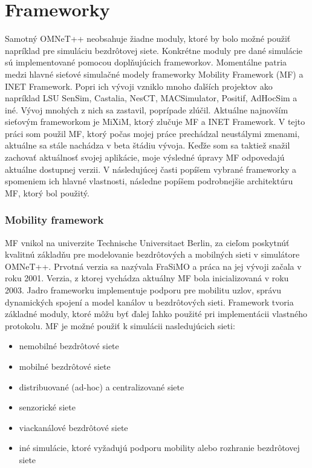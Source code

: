 \documentclass[11pt,twoside,a4paper]{book}
\begin{document}

\chapter{Frameworky}
Samotný OMNeT++ neobsahuje žiadne moduly, ktoré by bolo možné použiť napríklad pre simuláciu bezdrôtovej siete. Konkrétne moduly pre dané simulácie sú implementované pomocou doplňujúcich frameworkov. Momentálne patria medzi hlavné sieťové simulačné modely frameworky Mobility Framework (MF) a INET Framework\cite{INET}. Popri ich vývoji vzniklo mnoho ďalších projektov ako napríklad LSU SenSim, Castalia, NesCT, MACSimulator, Positif, AdHocSim a iné. Vývoj mnohých z nich sa zastavil, poprípade zlúčil. Aktuálne najnovším sieťovým frameworkom je MiXiM\cite{MIXIM}, ktorý zlučuje MF a INET Framework. V tejto práci som použil MF, ktorý počas mojej práce prechádzal neustálymi zmenami, aktuálne sa stále nachádza v beta štádiu vývoja. Keďže som sa taktiež snažil zachovať aktuálnosť svojej aplikácie, moje výsledné úpravy MF odpovedajú aktuálne dostupnej verzii. V následujúcej časti popíšem vybrané frameworky a spomeniem ich hlavné vlastnosti, následne popíšem podrobnejšie architektúru MF, ktorý bol použitý.

\subsection{Mobility framework}
MF vnikol na univerzite Technische Universitaet Berlin, za cieľom poskytnúť kvalitnú základňu pre modelovanie bezdrôtových a mobilných sieti v simulátore OMNeT++. Prvotná verzia sa nazývala FraSiMO a práca na jej vývoji začala v roku 2001. Verzia, z ktorej vychádza aktuálny MF bola inicializovaná v roku 2003. Jadro frameworku implementuje podporu pre mobilitu uzlov, správu dynamických spojení a model kanálov u bezdrôtových sieti. Framework tvoria základné moduly, ktoré môžu byť ďalej ľahko použité pri implementácii vlastného protokolu. MF je možné použiť k simulácii nasledujúcich sieti:
\begin{itemize}
 \item nemobilné bezdrôtové siete
 \item mobilné bezdrôtové siete
 \item distribuované (ad-hoc) a centralizované siete
 \item senzorické siete
 \item viackanálové bezdrôtové siete
 \item iné simulácie, ktoré vyžadujú podporu mobility alebo rozhranie bezdrôtovej siete
\end{itemize}
\end{document}
